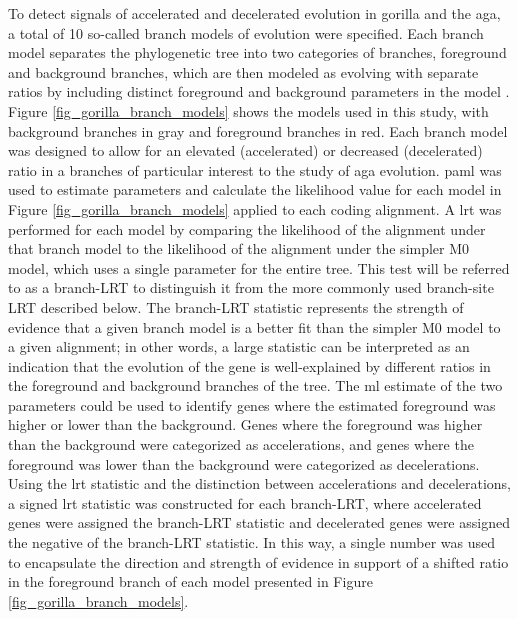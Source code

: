 To detect signals of accelerated and decelerated evolution in gorilla
and the \ac{aga}, a total of 10 so-called branch models of evolution
were specified. Each branch model separates the phylogenetic tree into
two categories of branches, foreground and background branches, which
are then modeled as evolving with separate \dnds ratios by including
distinct foreground and background \omg parameters in the model
\citep{Yang1998,Yang1998a}. Figure \ref{fig_gorilla_branch_models}
shows the models used in this study, with background branches in gray
and foreground branches in red. Each branch model was designed to
allow for an elevated (accelerated) or decreased (decelerated) \dnds
ratio in a branches of particular interest to the study of \ac{aga}
evolution. \ac{paml} was used to estimate parameters and calculate the
likelihood value for each model in Figure
\ref{fig_gorilla_branch_models} applied to each coding alignment. A
\ac{lrt} was performed for each model by comparing the likelihood of
the alignment under that branch model to the likelihood of the
alignment under the simpler M0 model, which uses a single \omg
parameter for the entire tree. This test will be referred to as a
branch-LRT to distinguish it from the more commonly used branch-site
LRT described below. The branch-LRT statistic represents the strength
of evidence that a given branch model is a better fit than the simpler
M0 model to a given alignment; in other words, a large statistic can
be interpreted as an indication that the evolution of the gene is
well-explained by different \dnds ratios in the foreground and
background branches of the tree. The \ac{ml} estimate of the two \omg
parameters could be used to identify genes where the estimated
foreground \omg was higher or lower than the background. Genes where
the foreground \omg was higher than the background were categorized as
accelerations, and genes where the foreground \omg was lower than the
background were categorized as decelerations. Using the \ac{lrt}
statistic and the distinction between accelerations and decelerations,
a signed \ac{lrt} statistic was constructed for each branch-LRT, where
accelerated genes were assigned the branch-LRT statistic and
decelerated genes were assigned the negative of the branch-LRT
statistic. In this way, a single number was used to encapsulate the
direction and strength of evidence in support of a shifted \dnds ratio
in the foreground branch of each model presented in Figure
\ref{fig_gorilla_branch_models}.

